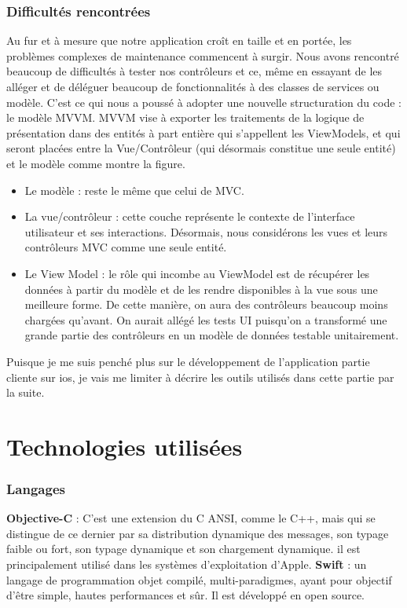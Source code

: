  \subsubsection{Difficultés rencontrées} %
 \label{ssub:difficultés_rencontrées_et_pourquoi_mvvm_}
 Au fur et à mesure que notre application croît en taille et en portée, les problèmes complexes de maintenance commencent à surgir. Nous avons rencontré beaucoup de difficultés à tester nos contrôleurs et ce, même en essayant de les alléger et de déléguer beaucoup de fonctionnalités à des classes de services ou modèle. C'est ce qui nous a poussé à adopter une nouvelle structuration du code : le modèle MVVM.\cite{mvvm}\newline
 MVVM vise à exporter les traitements de la logique de présentation dans des entités à part entière qui s'appellent les ViewModels, et qui seront placées entre la Vue/Contrôleur (qui désormais constitue une seule entité) et le modèle comme montre la figure.
 \begin{itemize}
 	\item Le modèle : reste le même que celui de MVC.
 	\item La vue/contrôleur : cette couche représente le contexte de l'interface utilisateur et ses interactions. Désormais, nous considérons les vues et leurs contrôleurs MVC comme une seule entité.
 	\item Le View Model : le rôle qui incombe au ViewModel est de récupérer les données à partir du modèle et de les rendre disponibles à la vue sous une meilleure forme. De cette manière, on aura des contrôleurs beaucoup moins chargées qu'avant. On aurait allégé les tests UI puisqu'on a transformé une grande partie des contrôleurs en un modèle de données testable unitairement.\clearpage
 \end{itemize}
 Puisque je me suis penché plus sur le développement de l'application partie cliente sur ios, je vais me limiter à décrire les outils utilisés dans cette partie par la suite.

\section{Technologies utilisées} %
\label{sec:technologies_et_outils_utilisés}
\subsubsection{Langages} %
\label{ssub:lanages}
\begin{itemize}
	\itemb \textbf{Objective-C} : C'est une extension du C ANSI, comme le C++, mais qui se distingue de ce dernier par sa distribution dynamique des messages, son typage faible ou fort, son typage dynamique et son chargement dynamique. il est principalement utilisé dans les systèmes d'exploitation d'Apple.
	\itemb \textbf{Swift} : un langage de programmation objet compilé, multi-paradigmes, ayant pour objectif d'être simple, hautes performances et sûr. Il est développé en open source.
\end{itemize}


